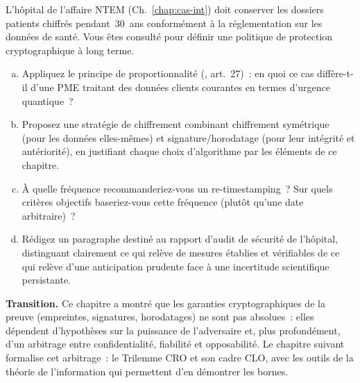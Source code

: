 \begin{boxexo}[title={\ding{45}\quad Exercice~26.3. Politique d'archivage à long terme \niveauexpert}]
L'hôpital de l'affaire NTEM (Ch.~\ref{chap:cas-int}) doit conserver
les dossiers patients chiffrés pendant~30~ans conformément à la
réglementation sur les données de santé. Vous êtes consulté pour
définir une politique de protection cryptographique à long terme.
\begin{enumerate}[(a)]
    \item Appliquez le principe de proportionnalité
          (, art.~27)~: en quoi ce cas diffère-t-il
          d'une PME traitant des données clients courantes en
          termes d'urgence quantique~?
    \item Proposez une stratégie de chiffrement combinant
          chiffrement symétrique (pour les données elles-mêmes)
          et signature/horodatage (pour leur intégrité et
          antériorité), en justifiant chaque choix d'algorithme
          par les éléments de ce chapitre.
    \item À quelle fréquence recommanderiez-vous un re-timestamping~?
          Sur quels critères objectifs baseriez-vous cette
          fréquence (plutôt qu'une date arbitraire)~?
    \item Rédigez un paragraphe destiné au rapport d'audit de
          sécurité de l'hôpital, distinguant clairement ce qui
          relève de mesures établies et vérifiables de ce qui
          relève d'une anticipation prudente face à une incertitude
          scientifique persistante.
\end{enumerate}
\end{boxexo}

\bigskip

\begin{boxinfo}
\textbf{Transition.} Ce chapitre a montré que les garanties
cryptographiques de la preuve (empreintes, signatures, horodatages)
ne sont pas absolues~: elles dépendent d'hypothèses sur la puissance
de l'adversaire et, plus profondément, d'un arbitrage entre
confidentialité, fiabilité et opposabilité. Le chapitre suivant
formalise cet arbitrage~: le Trilemme CRO et son cadre CLO, avec
les outils de la théorie de l'information qui permettent d'en
démontrer les bornes.
\end{boxinfo}